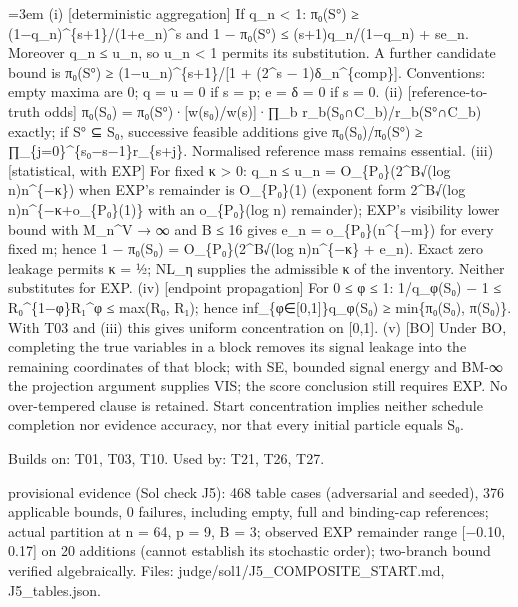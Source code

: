 \documentclass[11pt]{report}
\newenvironment{mdblock}{\begingroup\mdfont\raggedright\setlength{\parindent}{0pt}\setlength{\parskip}{0.55em}\emergencystretch=3em}{\par\endgroup}
\newcommand{\mdhead}[2]{\par\vspace{0.7em}\noindent{\bfseries\ifcase#1\or\large\or\normalsize\or\normalsize\or\small\or\small\or\small\fi #2}\par\nopagebreak\vspace{0.1em}}
\begin{document}
\begin{mdblock}
(i) [deterministic aggregation] If q\_n < 1: π₀(S°) ≥ (1−q\_n)\textasciicircum{}\{s+1\}/(1+e\_n)\textasciicircum{}s and 1 − π₀(S°) ≤ (s+1)q\_n/(1−q\_n) + se\_n. Moreover q\_n ≤ u\_n, so u\_n < 1 permits its substitution. A further candidate bound is π₀(S°) ≥ (1−u\_n)\textasciicircum{}\{s+1\}/[1 + (2\textasciicircum{}s − 1)δ\_n\textasciicircum{}\{comp\}]. Conventions: empty maxima are 0; q = u = 0 if s = p; e = δ = 0 if s = 0. (ii) [reference-to-truth odds] π₀(S₀) = π₀(S°)·[w(s₀)/w(s)]·∏\_b r\_b(S₀∩C\_b)/r\_b(S°∩C\_b) exactly; if S° ⊆ S₀, successive feasible additions give π₀(S₀)/π₀(S°) ≥ ∏\_\{j=0\}\textasciicircum{}\{s₀−s−1\}r\_\{s+j\}. Normalised reference mass remains essential. (iii) [statistical, with EXP] For fixed κ > 0: q\_n ≤ u\_n = O\_\{P₀\}(2\textasciicircum{}B√(log n)n\textasciicircum{}\{−κ\}) when EXP's remainder is O\_\{P₀\}(1) (exponent form 2\textasciicircum{}B√(log n)n\textasciicircum{}\{−κ+o\_\{P₀\}(1)\} with an o\_\{P₀\}(log n) remainder); EXP's visibility lower bound with M\_n\textasciicircum{}V → ∞ and B ≤ 16 gives e\_n = o\_\{P₀\}(n\textasciicircum{}\{−m\}) for every fixed m; hence 1 − π₀(S₀) = O\_\{P₀\}(2\textasciicircum{}B√(log n)n\textasciicircum{}\{−κ\} + e\_n). Exact zero leakage permits κ = ½; NL\_η supplies the admissible κ of the inventory. Neither substitutes for EXP. (iv) [endpoint propagation] For 0 ≤ φ ≤ 1: 1/q\_φ(S₀) − 1 ≤ R₀\textasciicircum{}\{1−φ\}R₁\textasciicircum{}φ ≤ max(R₀, R₁); hence inf\_\{φ∈[0,1]\}q\_φ(S₀) ≥ min\{π₀(S₀), π(S₀)\}. With T03 and (iii) this gives uniform concentration on [0,1]. (v) [BO] Under BO, completing the true variables in a block removes its signal leakage into the remaining coordinates of that block; with SE, bounded signal energy and BM-∞ the projection argument supplies VIS; the score conclusion still requires EXP. No over-tempered clause is retained. Start concentration implies neither schedule completion nor evidence accuracy, nor that every initial particle equals S₀.

\mdhead{2}{Dependencies}

Builds on: T01, T03, T10. Used by: T21, T26, T27.

\mdhead{2}{Numerical evidence (provisional)}

provisional evidence (Sol check J5): 468 table cases (adversarial and seeded), 376 applicable bounds, 0 failures, including empty, full and binding-cap references; actual partition at n = 64, p = 9, B = 3; observed EXP remainder range [−0.10, 0.17] on 20 additions (cannot establish its stochastic order); two-branch bound verified algebraically. Files: judge/sol1/J5\_COMPOSITE\_START.md, J5\_tables.json.


\end{mdblock}
\end{document}
